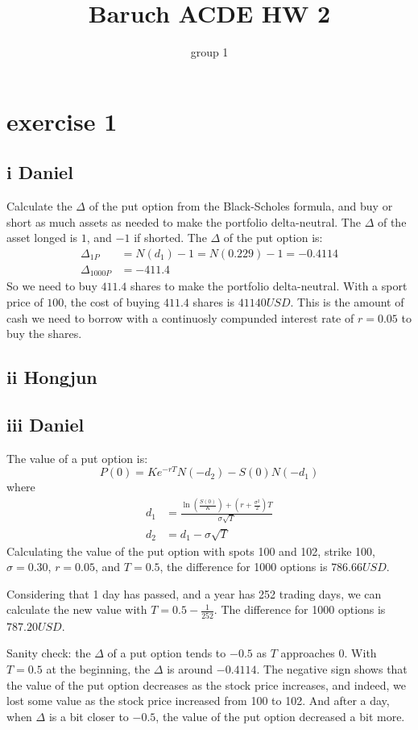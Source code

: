 \documentclass{article}
\title{Baruch ACDE HW 2}
\author{group 1}
\begin{document}
\maketitle
\tableofcontents
\section{exercise 1}
\subsection{i Daniel}
Calculate the $\Delta$ of the put option from the Black-Scholes formula,
and buy or short as much assets as needed to make the portfolio delta-neutral.
The $\Delta$ of the asset longed is $1$, and $-1$ if shorted. The $\Delta$ of the put option is:
\begin{align}
    \Delta_{1P}    & = N(d_1) - 1 = N(0.229) - 1 = -0.4114 \\
    \Delta_{1000P} & = -411.4
\end{align}
So we need to buy $411.4$ shares to make the portfolio delta-neutral.
With a sport price of $100$, the cost of buying $411.4$ shares is $41140USD$.
This is the amount of cash we need to borrow with a continuosly compunded interest rate of $r=0.05$ to buy the shares.
\subsection{ii Hongjun}
\subsection{iii Daniel}
The value of a put option is:
\[P(0) = K e^{-rT} N(-d_2) - S(0) N(-d_1)\]
where
\begin{align*}
    d_1 & = \frac{\ln\left(\frac{S(0)}{K}\right) + \left(r + \frac{\sigma^2}{2}\right)T}{\sigma\sqrt{T}} \\
    d_2 & = d_1 - \sigma\sqrt{T}
\end{align*}
Calculating the value of the put option with spots 100 and 102,
strike 100, $\sigma = 0.30$, $r = 0.05$, and $T = 0.5$,
the difference for 1000 options is $786.66USD$.

Considering that 1 day has passed, and a year has 252 trading days,
we can calculate the new value with $T = 0.5 - \frac{1}{252}$.
The difference for 1000 options is $787.20USD$.

Sanity check: the $\Delta$ of a put option tends to $-0.5$ as $T$ approaches 0.
With $T=0.5$ at the beginning, the $\Delta$ is around $-0.4114$.
The negative sign shows that the value of the put option decreases as the stock price increases,
and indeed, we lost some value as the stock price increased from 100 to 102.
And after a day, when $\Delta$ is a bit closer to $-0.5$,
the value of the put option decreased a bit more.
\end{document}

